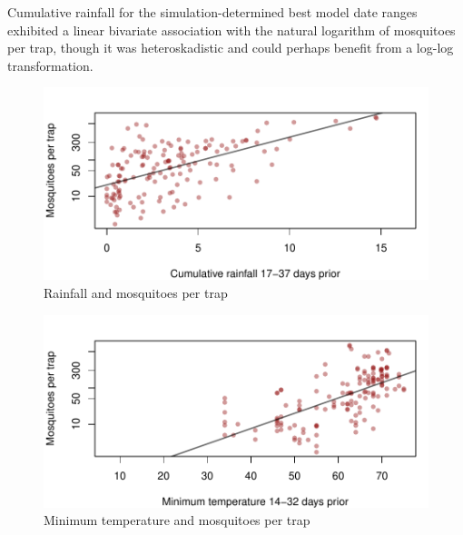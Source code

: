 \documentclass{article}
\begin{document}
\begin{multicols}{2}
Cumulative rainfall for the simulation-determined best model date ranges exhibited a linear bivariate association with the natural logarithm of mosquitoes per trap, though it was heteroskadistic and could perhaps benefit from a log-log transformation.
\vspace{-3mm}
\begin{figure}[H]
\begin{center}  
\includegraphics{mosquitoRainTempArticle-010}
\caption{Rainfall and mosquitoes per trap}
\end{center}
\end{figure}

\vspace{-10mm}

\begin{figure}[H]
\begin{center}  
\includegraphics{mosquitoRainTempArticle-011}
\caption{Minimum temperature and mosquitoes per trap}
\end{center}
\end{figure}

\end{multicols}
\end{document}
